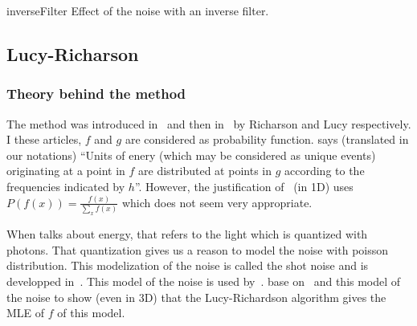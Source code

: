\begin{myfig}{inverseFilter}
  {Effect of the noise with an inverse filter.}
\end{myfig}


\subsection{Lucy-Richarson}
\label{subsec:Lucy}
\subsubsection{Theory behind the method}
The method was introduced in~\cite{richardson1972bayesian} and
then in~\cite{lucy1974iterative} by Richarson and Lucy respectively.
I these articles, $f$ and $g$ are considered as probability function.
\cite{richardson1972bayesian} says (translated in our notations)
``Units of enery (which may be considered as unique events)
originating at a point in $f$ are distributed at points in $g$
according to the frequencies indicated by $h$''.
However, the justification of~\cite{richardson1972bayesian} (in 1D) uses
$P(f(x)) = \frac{f(x)}{\sum_x f(x)}$ which does not seem
very appropriate.

When \cite{richardson1972bayesian} talks about energy,
that refers to the light which is quantized with photons.
That quantization gives us a reason to model the noise with
poisson distribution.
This modelization of the noise is called the shot noise and
is developped in~\cite{blanter2000shot}.
This model of the noise is used by~\cite{hebert1989generalized}.
\cite{temerinac2010tile} base on~\cite{hebert1989generalized}
and this model of the noise to show (even in 3D)
that the Lucy-Richardson algorithm gives the MLE of $f$ of this
model.

